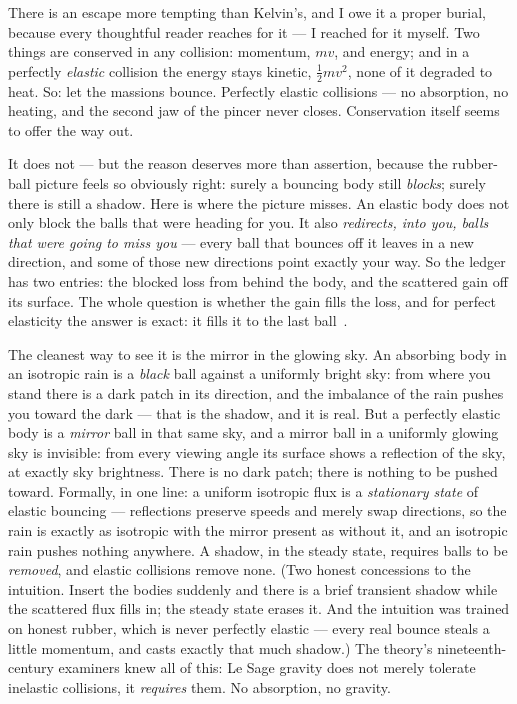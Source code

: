\documentclass[fontsize=11pt,paper=a4,pagesize=auto,parskip=half-]{scrbook}
\newcommand{\Iy}[1]{#1\index{#1}}
\begin{document}
There is an escape more tempting than \Iy{Kelvin}'s, and I owe it a proper burial, because every thoughtful reader reaches for it --- I reached for it myself. Two things are conserved in any collision: momentum, $mv$, and energy; and in a perfectly \emph{elastic} collision the energy stays kinetic, $\tfrac{1}{2}mv^{2}$, none of it degraded to heat. So: let the massions bounce. Perfectly elastic collisions --- no absorption, no heating, and the second jaw of the pincer never closes. Conservation itself seems to offer the way out.

It does not --- but the reason deserves more than assertion, because the rubber-ball picture feels so obviously right: surely a bouncing body still \emph{blocks}; surely there is still a shadow. Here is where the picture misses. An elastic body does not only block the balls that were heading for you. It also \emph{redirects, into you, balls that were going to miss you} --- every ball that bounces off it leaves in a new direction, and some of those new directions point exactly your way. So the ledger has two entries: the blocked loss from behind the body, and the scattered gain off its surface. The whole question is whether the gain fills the loss, and for perfect elasticity the answer is exact: it fills it to the last ball~\cite{darwin1905}.

The cleanest way to see it is the mirror in the glowing sky. An absorbing body in an isotropic rain is a \emph{black} ball against a uniformly bright sky: from where you stand there is a dark patch in its direction, and the imbalance of the rain pushes you toward the dark --- that is the shadow, and it is real. But a perfectly elastic body is a \emph{mirror} ball in that same sky, and a mirror ball in a uniformly glowing sky is invisible: from every viewing angle its surface shows a reflection of the sky, at exactly sky brightness. There is no dark patch; there is nothing to be pushed toward. Formally, in one line: a uniform isotropic flux is a \emph{stationary state} of elastic bouncing --- reflections preserve speeds and merely swap directions, so the rain is exactly as isotropic with the mirror present as without it, and an isotropic rain pushes nothing anywhere. A shadow, in the steady state, requires balls to be \emph{removed}, and elastic collisions remove none. (Two honest concessions to the intuition. Insert the bodies suddenly and there is a brief transient shadow while the scattered flux fills in; the steady state erases it. And the intuition was trained on honest rubber, which is never perfectly elastic --- every real bounce steals a little momentum, and casts exactly that much shadow.) The theory's nineteenth-century examiners knew all of this: Le Sage gravity does not merely tolerate inelastic collisions, it \emph{requires} them. No absorption, no gravity.
\end{document}
